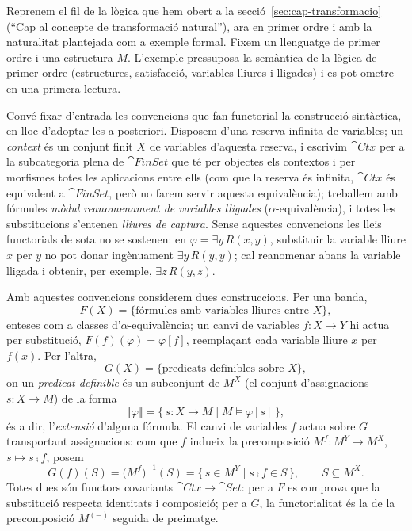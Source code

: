 \begin{exemple}\label{ex:interpretacio-primer-ordre}
Reprenem el fil de la lògica que hem obert a la secció~\ref{sec:cap-transformacio} (\enquote{Cap al concepte de transformació natural}), ara en primer ordre i amb la naturalitat plantejada com a exemple formal. Fixem un llenguatge de primer ordre i una estructura $M$. L'exemple pressuposa la semàntica de la lògica de primer ordre (estructures, satisfacció, variables lliures i lligades) i es pot ometre en una primera lectura.

Convé fixar d'entrada les convencions que fan functorial la construcció sintàctica, en lloc d'adoptar-les a posteriori. Disposem d'una reserva infinita de variables; un \emph{context} és un conjunt finit $X$ de variables d'aquesta reserva, i escrivim $\cat{Ctx}$ per a la subcategoria plena de $\cat{FinSet}$ que té per objectes els contextos i per morfismes totes les aplicacions entre ells (com que la reserva és infinita, $\cat{Ctx}$ és equivalent a $\cat{FinSet}$, però no farem servir aquesta equivalència); treballem amb fórmules \emph{mòdul reanomenament de variables lligades} ($\alpha$-equivalència), i totes les substitucions s'entenen \emph{lliures de captura}. Sense aquestes convencions les lleis functorials de sota no se sostenen: en $\varphi=\exists y\,R(x,y)$, substituir la variable lliure $x$ per $y$ no pot donar ingènuament $\exists y\,R(y,y)$; cal reanomenar abans la variable lligada i obtenir, per exemple, $\exists z\,R(y,z)$.

Amb aquestes convencions considerem dues construccions. Per una banda,
\[
F(X)=\{\text{fórmules amb variables lliures entre }X\},
\]
enteses com a classes d'$\alpha$-equivalència; un canvi de variables $f\colon X\to Y$ hi actua per substitució, $F(f)(\varphi)=\varphi[f]$, reemplaçant cada variable lliure $x$ per $f(x)$. Per l'altra,
\[
G(X)=\{\text{predicats definibles sobre }X\},
\]
on un \emph{predicat definible} és un subconjunt de $M^X$ (el conjunt d'assignacions $s\colon X\to M$) de la forma
\[
\llbracket\varphi\rrbracket=\{\,s\colon X\to M\mid M\models\varphi[s]\,\},
\]
és a dir, l'\emph{extensió} d'alguna fórmula. El canvi de variables $f$ actua sobre $G$ transportant assignacions: com que $f$ indueix la precomposició $M^{f}\colon M^{Y}\to M^{X}$, $s\mapsto s\comp f$, posem
\[
G(f)(S)=\bigl(M^{f}\bigr)^{-1}(S)=\{\,s\in M^{Y}\mid s\comp f\in S\,\},\qquad S\subseteq M^{X}.
\]
Totes dues són functors covariants $\cat{Ctx}\to\cat{Set}$: per a $F$ es comprova que la substitució respecta identitats i composició\footnotemark; per a $G$, la functorialitat és la de la precomposició $M^{(-)}$ seguida de preimatge.


\end{exemple}
